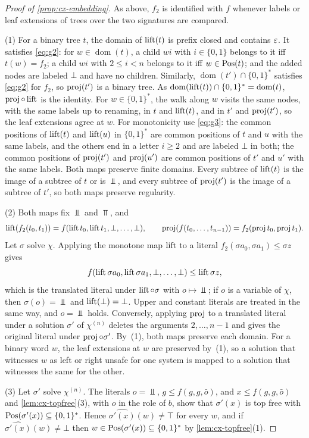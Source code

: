 \begin{proof}[Proof of \cref{prop:cx-embedding}]
As above, $f_2$ is identified with $f$ whenever labels or leaf
extensions of trees over the two signatures are compared.

(1) For a binary tree $t$, the domain of $\operatorname{lift}(t)$ is prefix closed and
contains $\varepsilon$. It satisfies \eqref{eq:g2}: for $w\in\operatorname{dom}(t)$, a
child $wi$ with $i\in\{0,1\}$ belongs to it iff $t(w)=f_2$; a child $wi$ with
$2\le i<n$ belongs to it iff $w\in\operatorname{Pos}(t)$; and the added nodes are labeled
$\bot$ and have no children. Similarly, $\operatorname{dom}(t')\cap\{0,1\}^*$
satisfies \eqref{eq:g2} for $f_2$, so $\operatorname{proj}(t')$ is a binary tree. As
$\operatorname{dom}(\operatorname{lift}(t))\cap\{0,1\}^*=\operatorname{dom}(t)$,
$\operatorname{proj}\circ\operatorname{lift}$ is the identity. For $w\in\{0,1\}^*$, the walk along $w$
visits the same nodes, with the same labels up to renaming, in $t$ and
$\operatorname{lift}(t)$, and in $t'$ and $\operatorname{proj}(t')$, so the leaf extensions agree at
$w$. For monotonicity use \eqref{eq:g3}: the common positions of $\operatorname{lift}(t)$ and $\operatorname{lift}(u)$ in
$\{0,1\}^*$ are common positions of $t$ and $u$ with the same labels, and the
others end in a letter $i\ge2$ and are labeled $\bot$ in both; the common
positions of $\operatorname{proj}(t')$ and $\operatorname{proj}(u')$ are common positions of $t'$ and
$u'$ with the same labels. Both maps preserve finite domains. Every subtree of
$\operatorname{lift}(t)$ is the image of a subtree of $t$ or is $\Bot$, and every subtree of
$\operatorname{proj}(t')$ is the image of a subtree of $t'$, so both maps preserve
regularity.

(2) Both maps fix $\Bot$ and $\Top$, and
\[
 \operatorname{lift}(f_2(t_0,t_1))=f(\operatorname{lift} t_0,\operatorname{lift} t_1,\bot,\ldots,\bot),\qquad
 \operatorname{proj}(f(t_0,\ldots,t_{n-1}))=f_2(\operatorname{proj} t_0,\operatorname{proj} t_1).
\]
Let $\sigma$ solve $\chi$. Applying the monotone map $\operatorname{lift}$ to a literal
$f_2(\sigma a_0,\sigma a_1)\le\sigma z$ gives
\[
 f(\operatorname{lift}\sigma a_0,\operatorname{lift}\sigma a_1,\bot,\ldots,\bot)\le\operatorname{lift}\sigma z,
\]
which is the translated literal under $\operatorname{lift}\circ\sigma$ with $o\mapsto\Bot$; if $o$ is
a variable of $\chi$, then $\sigma(o)=\Bot$ and $\operatorname{lift}(\bot)=\bot$. Upper and
constant literals are treated in the same way, and $o=\Bot$ holds. Conversely,
applying $\operatorname{proj}$ to a translated literal under a solution $\sigma'$ of
$\chi^{(n)}$ deletes the arguments $2,\ldots,n-1$ and gives the original literal
under $\operatorname{proj}\circ\sigma'$. By~(1), both maps preserve each domain. For a binary
word $w$, the leaf extensions at $w$ are preserved by~(1), so a solution that
witnesses $w$ as left or right unsafe for one system is mapped to a solution
that witnesses the same for the other.

(3) Let $\sigma'$ solve $\chi^{(n)}$. The literals $o=\Bot$,
$g\le f(g,g,\bar o)$, and $x\le f(g,g,\bar o)$ and \cref{lem:cx-topfree}(3), with
$o$ in the role of $b$, show that $\sigma'(x)$ is top free with
$\operatorname{Pos}(\sigma'(x))\subseteq\{0,1\}^*$. Hence $\widehat{\sigma'(x)}(w)\ne\top$ for
every $w$, and if $\widehat{\sigma'(x)}(w)\ne\bot$ then
$w\in\operatorname{Pos}(\sigma'(x))\subseteq\{0,1\}^*$ by \cref{lem:cx-topfree}(1).
\end{proof}


